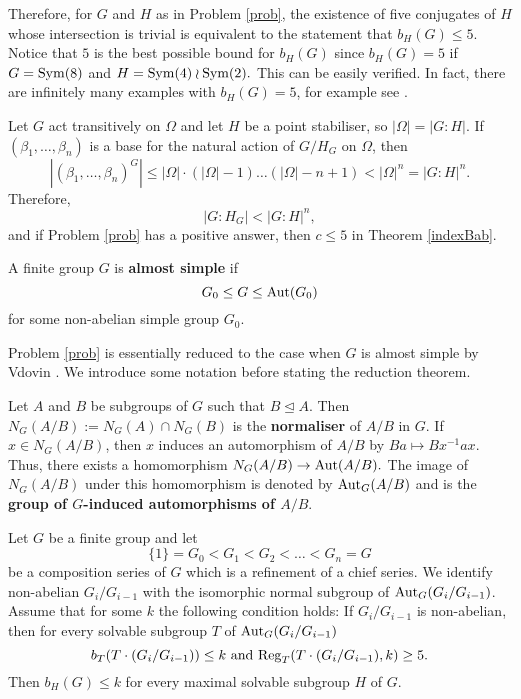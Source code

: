 Therefore, for $G$ and $H$ as in Problem \ref{prob}, the existence of five conjugates of $H$ whose intersection is trivial is equivalent to the statement that $b_H(G)\le 5.$ Notice that $5$ is the best possible bound for $b_H(G)$ since $b_H(G)=5$ if $G=\mathrm{Sym}(8)$ and $H=\mathrm{Sym}(4) \wr \mathrm{Sym}(2).$ This can be easily verified. In fact, there are infinitely many examples with $b_H(G)=5$, for example see \cite[Remark 8.3]{burPS}.   



 Let  $G$ act transitively on $\Omega$ and let $H$ be a point stabiliser, so $|\Omega|=|G:H|.$ If $(\beta_1 , \ldots , \beta_n )$ is a base for the natural action of $G/H_G$ on $\Omega$, then $$|(\beta_1 , \ldots , \beta_n )^G| \le |\Omega| \cdot (|\Omega|-1) \ldots (|\Omega|-n+1)<|\Omega|^n=|G:H|^n.$$
Therefore,
$$|G:H_G|<|G:H|^n,$$
and if Problem \ref{prob} has a positive answer, then $c \le 5$ in Theorem \ref{indexBab}.

\medskip

A finite group $G$ is {\bf almost simple} if $$G_0 \le G \le \mathrm{Aut}(G_0)$$
for some non-abelian simple group $G_0.$

Problem \ref{prob} is essentially reduced to the case when $G$ is almost simple  by Vdovin  \cite{vd}. We introduce some notation before stating the reduction theorem.



Let $A$ and $B$ be subgroups of $G$ such that $B \trianglelefteq A.$ Then $N_G(A/B) := N_G(A) \cap N_G(B)$ is the {\bf normaliser} of $A/B$ in $G$. If $x\in N_G(A/B)$, then $x$ induces an
automorphism of $A/B$ by $Ba \mapsto Bx^{-1}ax.$ Thus, there exists a homomorphism $N_G(A/B) \to \mathrm{Aut}(A/B).$ The image of $N_G(A/B)$ under this homomorphism is
denoted by $\mathrm{Aut}_G(A/B)$ and is the {\bf group of $G$-induced automorphisms of $A/B$}. 






\begin{Th}[\cite{vd}]\label{sved}
Let $G$ be a finite group and let
$$\{1\}=G_0<G_1< G_2< \ldots < G_n=G $$
be a composition series of $G$ which is a refinement of a chief series. We identify non-abelian $G_i/G_{i-1}$ with the isomorphic normal subgroup of $\mathrm{Aut}_G(G_i/G_{i-1})$.   Assume that for
some $k$ the following condition holds: If $G_i/G_{i-1}$ is non-abelian, then for
every solvable subgroup $T$ of $\mathrm{Aut}_G(G_i/G_{i-1})$  
$$b_T(T \cdot (G_i/G_{i-1})) \le k \mbox{ and } \mathrm{Reg}_T(T \cdot (G_i/G_{i-1}),k)\ge5.$$
Then $b_H(G)\le k$ for every maximal solvable subgroup $H$ of $G$.  
\end{Th}


